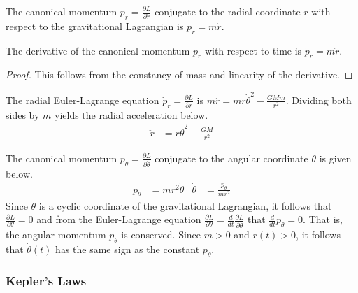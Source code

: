 The canonical momentum $p_r = \frac{\partial L}{\partial \dot{r}}$ conjugate to the radial coordinate $r$ with respect to the gravitational Lagrangian is $p_r = m \dot{r}$.

\begin{lemma}
	The derivative of the canonical momentum $p_r$ with respect to time is $\dot{p}_r = m \ddot{r}$.
\end{lemma}
\begin{proof}
	This follows from the constancy of mass and linearity of the derivative.
\end{proof}

The radial Euler-Lagrange equation $\dot{p}_r = \frac{\partial L}{\partial r}$ is $m \ddot{r} = m r \dot{\theta}^2 - \frac{G M m}{r^2}$.
Dividing both sides by $m$ yields the radial acceleration below.
\begin{align}\label{eqn:radial}
	\ddot{r} & = r \dot{\theta}^2 - \frac{G M}{r^2}
\end{align}

The canonical momentum $p_\theta = \frac{\partial L}{\partial \dot{\theta}}$ conjugate to the angular coordinate $\theta$ is given below.
\begin{align}\label{eqn:grangle}
	p_\theta     & = m r^2 \dot{\theta}
	             &
	\dot{\theta} & = \frac{p_\theta}{m r^2}
\end{align}
Since $\theta$ is a cyclic coordinate of the gravitational Lagrangian, it follows that $\frac{\partial L}{\partial \theta} = 0$ and from the Euler-Lagrange equation $\frac{\partial L}{\partial \theta} = \frac{d}{dt} \frac{\partial L}{\partial \dot{\theta}}$ that $\frac{d}{dt} p_\theta = 0$.
That is, the angular momentum $p_\theta$ is conserved.
Since $m > 0$ and $r(t) > 0$, it follows that $\dot{\theta}(t)$ has the same sign as the constant $p_\theta$.

\subsubsection*{Kepler's Laws}

